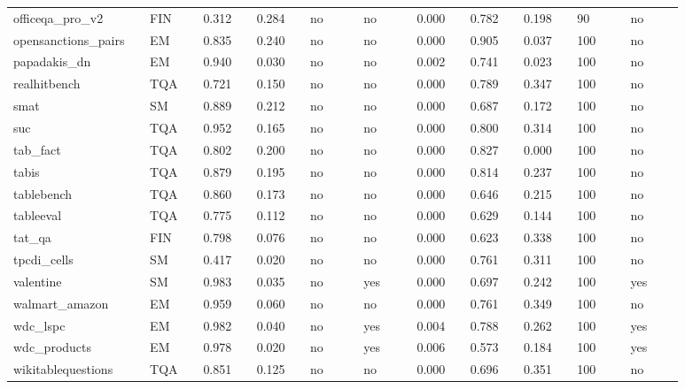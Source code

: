 \begin{landscape}
\begin{longtable}{p{0.147\linewidth}p{0.073\linewidth}p{0.073\linewidth}p{0.073\linewidth}p{0.073\linewidth}p{0.073\linewidth}p{0.073\linewidth}p{0.073\linewidth}p{0.073\linewidth}p{0.073\linewidth}p{0.073\linewidth}}
officeqa\_\allowbreak{}pro\_\allowbreak{}v2 & FIN & 0.312 & 0.284 & no & no & 0.000 & 0.782 & 0.198 & 90 & no \\
opensanctions\_\allowbreak{}pairs & EM & 0.835 & 0.240 & no & no & 0.000 & 0.905 & 0.037 & 100 & no \\
papadakis\_\allowbreak{}dn & EM & 0.940 & 0.030 & no & no & 0.002 & 0.741 & 0.023 & 100 & no \\
realhitbench & TQA & 0.721 & 0.150 & no & no & 0.000 & 0.789 & 0.347 & 100 & no \\
smat & SM & 0.889 & 0.212 & no & no & 0.000 & 0.687 & 0.172 & 100 & no \\
suc & TQA & 0.952 & 0.165 & no & no & 0.000 & 0.800 & 0.314 & 100 & no \\
tab\_\allowbreak{}fact & TQA & 0.802 & 0.200 & no & no & 0.000 & 0.827 & 0.000 & 100 & no \\
tabis & TQA & 0.879 & 0.195 & no & no & 0.000 & 0.814 & 0.237 & 100 & no \\
tablebench & TQA & 0.860 & 0.173 & no & no & 0.000 & 0.646 & 0.215 & 100 & no \\
tableeval & TQA & 0.775 & 0.112 & no & no & 0.000 & 0.629 & 0.144 & 100 & no \\
tat\_\allowbreak{}qa & FIN & 0.798 & 0.076 & no & no & 0.000 & 0.623 & 0.338 & 100 & no \\
tpcdi\_\allowbreak{}cells & SM & 0.417 & 0.020 & no & no & 0.000 & 0.761 & 0.311 & 100 & no \\
valentine & SM & 0.983 & 0.035 & no & yes & 0.000 & 0.697 & 0.242 & 100 & yes \\
walmart\_\allowbreak{}amazon & EM & 0.959 & 0.060 & no & no & 0.000 & 0.761 & 0.349 & 100 & no \\
wdc\_\allowbreak{}lspc & EM & 0.982 & 0.040 & no & yes & 0.004 & 0.788 & 0.262 & 100 & yes \\
wdc\_\allowbreak{}products & EM & 0.978 & 0.020 & no & yes & 0.006 & 0.573 & 0.184 & 100 & yes \\
wikitablequestions & TQA & 0.851 & 0.125 & no & no & 0.000 & 0.696 & 0.351 & 100 & no \\
\bottomrule
\end{longtable}
\normalsize
\end{landscape}
